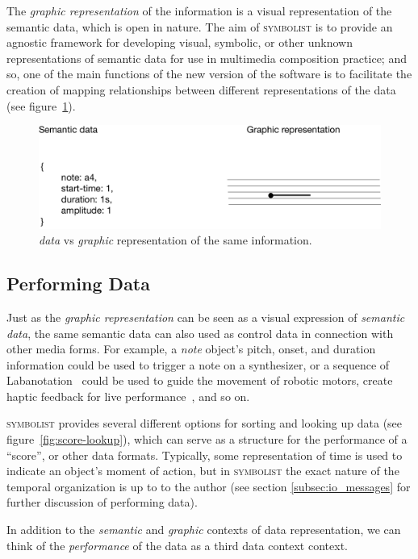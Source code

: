 \documentclass{article}
\def\symbolist{\textsc{symbolist}\xspace}
\begin{document}
The \textit{graphic representation} of the information is a visual representation of the semantic data, which is open in nature. The aim of \symbolist is to provide an agnostic framework for developing visual, symbolic, or other unknown representations of semantic data for use in multimedia composition practice; and so, one of the main functions of the new version of the software is to facilitate the creation of mapping relationships between different representations of the data (see figure~\ref{fig:graphic-representation}).


\begin{figure}[ht!]
\centering
\includegraphics[width=0.8\columnwidth]{graphic-representation.pdf}
\caption{\textit{data} vs \textit{graphic} representation of the same information.
\label{fig:graphic-representation}}
\end{figure}

\subsection{Performing Data}

Just as the \textit{graphic representation} can be seen as a visual expression of \textit{semantic data}, the same semantic data can also used as control data in connection with other media forms. For example, a \textit{note} object's pitch, onset, and duration information could be used to trigger a note on a synthesizer, or a sequence of Labanotation~\cite{guest2014labanotation} could be used to guide the movement of robotic motors, create haptic feedback for live performance~\cite{west2019design}, and so on. 

\symbolist provides several different options for sorting and looking up data (see figure~\ref{fig:score-lookup}), which can serve as a structure for the performance of a ``score'', or other data formats. Typically, some representation of time is used to indicate an object's moment of action, but in \symbolist the exact nature of the temporal organization is up to to the author (see section \ref{subsec:io_messages} for further discussion of performing data). 

In addition to the \textit{semantic} and \textit{graphic} contexts of data representation, we can think of the \textit{performance} of the data as a third data context context.
\end{document}
